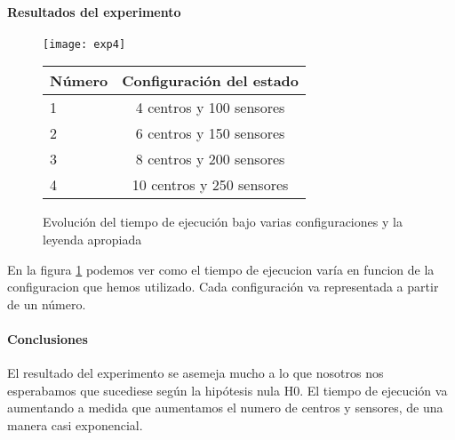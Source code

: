 \paragraph{Resultados del experimento}

\begin{figure}[h]
  \centering
  \texttt{[image: exp4]}
  \begin{tabular}{ | l | c | }
    \hline
    Número & Configuración del estado \\
    \hline
    1 & 4 centros y 100 sensores \\
    2 & 6 centros y 150 sensores \\
    3 & 8 centros y 200 sensores \\
    4 & 10 centros y 250 sensores \\
    \hline
  \end{tabular}
  \caption{Evolución del tiempo de ejecución bajo varias configuraciones
  y la leyenda apropiada}
  \label{fig:exp4-time-evolution}
\end{figure}

En la figura \ref{fig:exp4-time-evolution} podemos ver como el tiempo de
ejecucion varía en funcion de la configuracion que hemos utilizado.
Cada configuración va representada a partir de un número.

\paragraph{Conclusiones}

El resultado del experimento se asemeja mucho a lo que nosotros nos esperabamos
que sucediese según la hipótesis nula H0. El tiempo de ejecución va aumentando
a medida que aumentamos el numero de centros y sensores, de una manera casi
exponencial.

